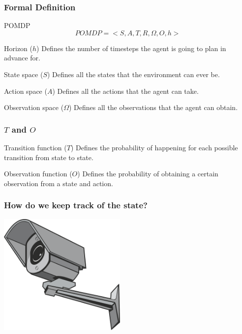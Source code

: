 \documentclass[xcolor={dvipsnames}]{beamer}
\begin{document}
\begin{frame}
\frametitle{Formal Definition}
\begin{block}{POMDP}
\begin{equation}
 POMDP = <S,A,T,R,\Omega,O,h> \nonumber
\end{equation}
\end{block}
\begin{block}{Horizon ($h$)}
    Defines the number of timesteps the agent is going to plan in advance for.
\end{block}
\begin{block}{State space ($S$)}
    Defines all the states that the environment can ever be.
\end{block}
\begin{block}{Action space ($A$)}
    Defines all the actions that the agent can take.
\end{block}
\begin{block}{Observation space ($\Omega$)}
    Defines all the observations that the agent can obtain.
\end{block}
\end{frame}

\begin{frame}
\frametitle{$T$ and $O$}
\begin{block}{Transition function ($T$)}
    Defines the probability of happening for each possible transition from state to state.
\end{block}
\begin{block}{Observation function ($O$)}
    Defines the probability of obtaining a certain observation from a state and action.
\end{block}
\end{frame}

\begin{frame}
\frametitle{How do we keep track of the state?}
\centerline{\includegraphics[height=6cm]{images/camera.png}}
\end{frame}
\end{document}
